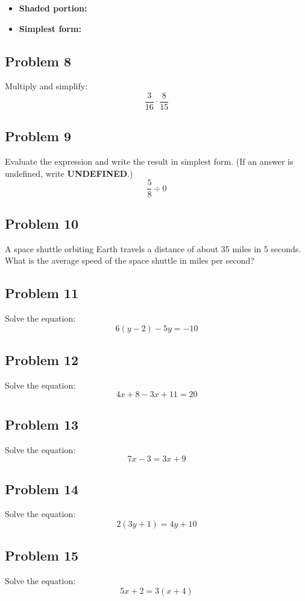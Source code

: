 \documentclass[12pt]{article}
\begin{document}
\begin{itemize}
    \item \textbf{Shaded portion:} \underline{\hspace{3cm}}  
    \item \textbf{Simplest form:} \underline{\hspace{3cm}}
\end{itemize}

\subsection*{Problem 8}
Multiply and simplify:  
\[
\dfrac{3}{16} \cdot \dfrac{8}{15}
\]

\subsection*{Problem 9}
Evaluate the expression and write the result in simplest form.  
(If an answer is undefined, write \textbf{UNDEFINED}.)
\[
\dfrac{5}{8} \div 0
\]

\subsection*{Problem 10}
A space shuttle orbiting Earth travels a distance of about 35 miles in 5 seconds.  
What is the average speed of the space shuttle in miles per second?

\subsection*{Problem 11}
Solve the equation:  
\[
6(y - 2) - 5y = -10
\]

\subsection*{Problem 12}
Solve the equation:  
\[
4x + 8 - 3x + 11 = 20
\]

\subsection*{Problem 13}
Solve the equation:  
\[
7x - 3 = 3x + 9
\]

\subsection*{Problem 14}
Solve the equation:  
\[
2(3y + 1) = 4y + 10
\]

\subsection*{Problem 15}
Solve the equation:  
\[
5x + 2 = 3(x + 4)
\]
\end{document}
